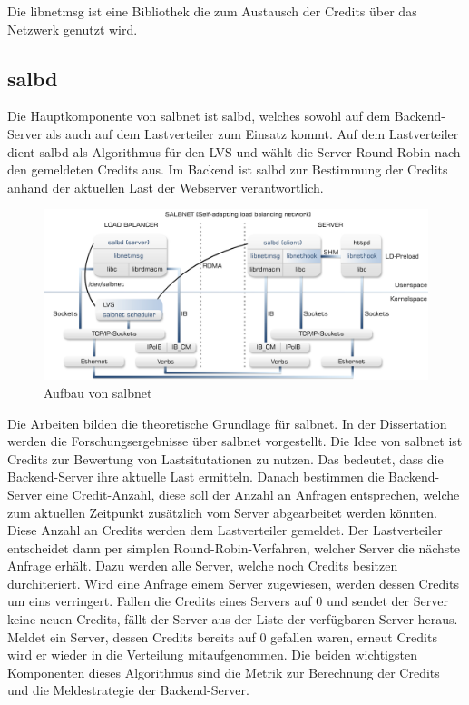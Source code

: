 \documentclass[a4paper, 12pt, BCOR10mm, DIV12, toc=bibliography, toc=listof, german]{scrbook}
\begin{document}
			Die libnetmsg ist eine Bibliothek die zum Austausch der Credits über das Netzwerk genutzt
			wird. 
			
			
			\subsection*{salbd} %

			Die Hauptkomponente von salbnet ist salbd, welches sowohl auf dem Backend-Server als auch auf
			dem Lastverteiler zum Einsatz kommt. Auf dem Lastverteiler dient salbd als Algorithmus für
			den LVS und wählt die Server Round-Robin nach den gemeldeten Credits aus. Im Backend ist salbd
			zur Bestimmung der Credits anhand der aktuellen Last der Webserver verantwortlich.
				

	
	\begin{figure}
		\centering
		\includegraphics[width=\textwidth]{images/salbnet}
		\caption{Aufbau von salbnet}
		\label{fig:salbnet}
	\end{figure}
	

	Die Arbeiten \cite{scsczile2008,schneidenbach2009} bilden die theoretische Grundlage für salbnet.
	In der Dissertation \cite{zinke2012} werden die Forschungsergebnisse über salbnet vorgestellt. Die
	Idee von salbnet ist Credits zur Bewertung von Lastsitutationen zu nutzen. Das bedeutet, dass die
	Backend-Server ihre aktuelle Last ermitteln. Danach bestimmen die Backend-Server eine
	Credit-Anzahl, diese soll der Anzahl an Anfragen entsprechen, welche zum aktuellen Zeitpunkt
	zusätzlich vom Server abgearbeitet werden könnten. Diese Anzahl an Credits werden dem
	Lastverteiler gemeldet. Der Lastverteiler entscheidet dann per simplen Round-Robin-Verfahren,
	welcher Server die nächste Anfrage erhält.  Dazu werden alle Server, welche noch Credits besitzen
	durchiteriert. Wird eine Anfrage einem Server zugewiesen, werden dessen Credits um eins
	verringert. Fallen die Credits eines Servers auf 0 und sendet der Server keine neuen Credits,
	fällt der Server aus der Liste der verfügbaren Server heraus. Meldet ein Server, dessen Credits
	bereits auf 0 gefallen waren, erneut Credits wird er wieder in die Verteilung mitaufgenommen. Die
	beiden wichtigsten Komponenten dieses Algorithmus sind die Metrik zur Berechnung der Credits und
	die Meldestrategie der Backend-Server.
\end{document}
